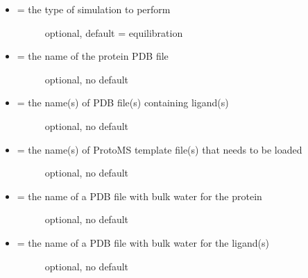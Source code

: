 \documentclass[letterpaper,10pt,english]{manual}
\begin{document}
\begin{itemize}
\item {} \begin{description}
\item[{ = the type of simulation to perform}] \leavevmode
optional, default = equilibration

\end{description}

\item {} \begin{description}
\item[{ = the name of the protein PDB file}] \leavevmode
optional, no default

\end{description}

\item {} \begin{description}
\item[{ = the name(s) of PDB file(s) containing ligand(s)}] \leavevmode
optional, no default

\end{description}

\item {} \begin{description}
\item[{ = the name(s) of ProtoMS template file(s) that needs to be loaded}] \leavevmode
optional, no default

\end{description}

\item {} \begin{description}
\item[{ = the name of a PDB file with bulk water for the protein}] \leavevmode
optional, no default

\end{description}

\item {} \begin{description}
\item[{ = the name of a PDB file with bulk water for the ligand(s)}] \leavevmode
optional, no default

\end{description}


\end{itemize}
\end{document}
